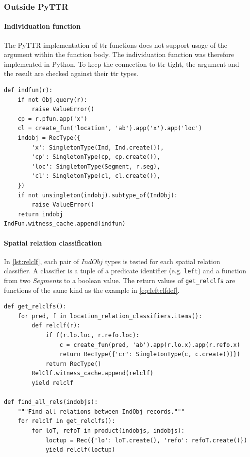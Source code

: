 \subsubsection{Outside PyTTR}

\paragraph{Individuation function}

The PyTTR implementation of \gls{ttr} functions does not support usage of the argument within the function body.
The individuation function was therefore implemented in Python.
To keep the connection to \gls{ttr} tight, the argument and the result are checked against their \gls{ttr} types.

\begin{lstlisting}[label={lst:indfun},caption={Individuation function}]
def indfun(r):
    if not Obj.query(r):
        raise ValueError()
    cp = r.pfun.app('x')
    cl = create_fun('location', 'ab').app('x').app('loc')
    indobj = RecType({
        'x': SingletonType(Ind, Ind.create()),
        'cp': SingletonType(cp, cp.create()),
        'loc': SingletonType(Segment, r.seg),
        'cl': SingletonType(cl, cl.create()),
    })
    if not unsingleton(indobj).subtype_of(IndObj):
        raise ValueError()
    return indobj
IndFun.witness_cache.append(indfun)
\end{lstlisting}

\paragraph{Spatial relation classification}

In \autoref{lst:relclf}, each pair of $IndObj$ types is tested for each spatial relation classifier.
A classifier is a tuple of a predicate identifier (e.g. {\tt left}) and a function from two $Segment$s to a boolean value.
The return values of {\tt get\_relclfs} are functions of the same kind as the example in \autoref{eq:leftclfdef}.

\begin{lstlisting}[label=lst:relclf, caption=Spatial relation classifiers]
def get_relclfs():
    for pred, f in location_relation_classifiers.items():
        def relclf(r):
            if f(r.lo.loc, r.refo.loc):
                c = create_fun(pred, 'ab').app(r.lo.x).app(r.refo.x)
                return RecType({'cr': SingletonType(c, c.create())})
            return RecType()
        RelClf.witness_cache.append(relclf)
        yield relclf

def find_all_rels(indobjs):
    """Find all relations between IndObj records."""
    for relclf in get_relclfs():
        for loT, refoT in product(indobjs, indobjs):
            loctup = Rec({'lo': loT.create(), 'refo': refoT.create()})
            yield relclf(loctup)
\end{lstlisting}

